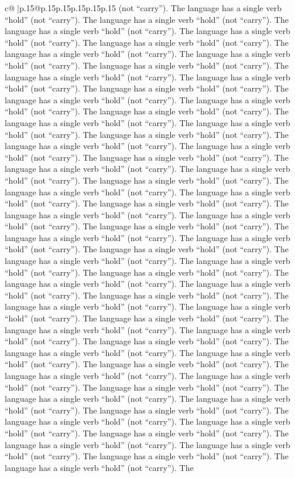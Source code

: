 \documentclass{article}
\begin{document}
{\begin{supertabular}{c@{$\;$}|p{.15\linewidth}@{}p{.15\linewidth}p{.15\linewidth}p{.15\linewidth}p{.15\linewidth}p{.15\linewidth}}
{{{(not “carry”). The language has a single verb “hold” (not “carry”). The language has a single verb “hold” (not “carry”). The language has a single verb “hold” (not “carry”). The language has a single verb “hold” (not “carry”). The language has a single verb “hold” (not “carry”). The language has a single verb “hold” (not “carry”). The language has a single verb “hold” (not “carry”). The language has a single verb “hold” (not “carry”). The language has a single verb “hold” (not “carry”). The language has a single verb “hold” (not “carry”). The language has a single verb “hold” (not “carry”). The language has a single verb “hold” (not “carry”). The language has a single verb “hold” (not “carry”). The language has a single verb “hold” (not “carry”). The language has a single verb “hold” (not “carry”). The language has a single verb “hold” (not “carry”). The language has a single verb “hold” (not “carry”). The language has a single verb “hold” (not “carry”). The language has a single verb “hold” (not “carry”). The language has a single verb “hold” (not “carry”). The language has a single verb “hold” (not “carry”). The language has a single verb “hold” (not “carry”). The language has a single verb “hold” (not “carry”). The language has a single verb “hold” (not “carry”). The language has a single verb “hold” (not “carry”). The language has a single verb “hold” (not “carry”). The language has a single verb “hold” (not “carry”). The language has a single verb “hold” (not “carry”). The language has a single verb “hold” (not “carry”). The language has a single verb “hold” (not “carry”). The language has a single verb “hold” (not “carry”). The language has a single verb “hold” (not “carry”). The language has a single verb “hold” (not “carry”). The language has a single verb “hold” (not “carry”). The language has a single verb “hold” (not “carry”). The language has a single verb “hold” (not “carry”). The language has a single verb “hold” (not “carry”). The language has a single verb “hold” (not “carry”). The language has a single verb “hold” (not “carry”). The language has a single verb “hold” (not “carry”). The language has a single verb “hold” (not “carry”). The language has a single verb “hold” (not “carry”). The language has a single verb “hold” (not “carry”). The language has a single verb “hold” (not “carry”). The language has a single verb “hold” (not “carry”). The language has a single verb “hold” (not “carry”). The language has a single verb “hold” (not “carry”). The language has a single verb “hold” (not “carry”). The language has a single verb “hold” (not “carry”). The language has a single verb “hold” (not “carry”). The language has a single verb “hold” (not “carry”). The language has a single verb “hold” (not “carry”). The language has a single verb “hold” (not “carry”). The language has a single verb “hold” (not “carry”). The language has a single verb “hold” (not “carry”). The language has a single verb “hold” (not “carry”). The language has a single verb “hold” (not “carry”). The language has a single verb “hold” (not “carry”). The language has a single verb “hold” (not “carry”). The language has a single verb “hold” (not “carry”). The }}}
\end{supertabular}}
\end{document}
